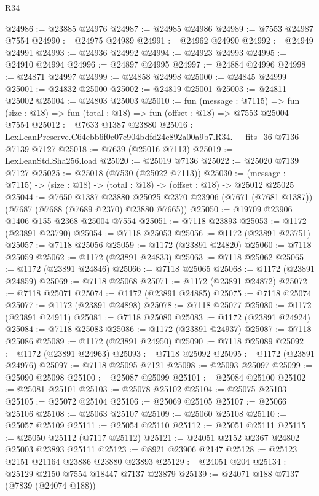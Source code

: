 \begin{lexlean}{R34}
\begin{coremodule}
@24986 := @23885 @24976
@24987 := @24985 @24986
@24989 := @7553 @24987 @7554
@24990 := @24975 @24989
@24991 := @24962 @24990
@24992 := @24949 @24991
@24993 := @24936 @24992
@24994 := @24923 @24993
@24995 := @24910 @24994
@24996 := @24897 @24995
@24997 := @24884 @24996
@24998 := @24871 @24997
@24999 := @24858 @24998
@25000 := @24845 @24999
@25001 := @24832 @25000
@25002 := @24819 @25001
@25003 := @24811 @25002
@25004 := @24803 @25003
@25010 := fun (message : @7115) =>
  fun (size : @18) => fun (total : @18) => fun (offset : @18) => @7553 @25004 @7554
@25012 := @7633 @1387 @23880
@25016 := LexLeanPreserve.C64ebb6f0c07e904bdfd24c892a00a9b7.R34.__fits_36 @7136 @7139 @7127
@25018 := @7639 (@25016 @7113)
@25019 := LexLeanStd.Sha256.load
@25020 := @25019 @7136
@25022 := @25020 @7139 @7127
@25025 := @25018 (@7530 (@25022 @7113))
@25030 := (message : @7115) -> (size : @18) -> (total : @18) -> (offset : @18) -> @25012 @25025
@25044 := @7650
    @1387
    @23880
    @25025
    @2370
    @23906
    (@7671 (@7681 @1387))
    (@7687 (@7688 (@7689 @2370) @23880 @7665))
@25050 := @19709 @23906 @1406 @155 @2368 @25004 @7554
@25051 := @7118 @23893
@25053 := @1172 (@23891 @23790)
@25054 := @7118 @25053
@25056 := @1172 (@23891 @23751)
@25057 := @7118 @25056
@25059 := @1172 (@23891 @24820)
@25060 := @7118 @25059
@25062 := @1172 (@23891 @24833)
@25063 := @7118 @25062
@25065 := @1172 (@23891 @24846)
@25066 := @7118 @25065
@25068 := @1172 (@23891 @24859)
@25069 := @7118 @25068
@25071 := @1172 (@23891 @24872)
@25072 := @7118 @25071
@25074 := @1172 (@23891 @24885)
@25075 := @7118 @25074
@25077 := @1172 (@23891 @24898)
@25078 := @7118 @25077
@25080 := @1172 (@23891 @24911)
@25081 := @7118 @25080
@25083 := @1172 (@23891 @24924)
@25084 := @7118 @25083
@25086 := @1172 (@23891 @24937)
@25087 := @7118 @25086
@25089 := @1172 (@23891 @24950)
@25090 := @7118 @25089
@25092 := @1172 (@23891 @24963)
@25093 := @7118 @25092
@25095 := @1172 (@23891 @24976)
@25097 := @7118 @25095 @7121
@25098 := @25093 @25097
@25099 := @25090 @25098
@25100 := @25087 @25099
@25101 := @25084 @25100
@25102 := @25081 @25101
@25103 := @25078 @25102
@25104 := @25075 @25103
@25105 := @25072 @25104
@25106 := @25069 @25105
@25107 := @25066 @25106
@25108 := @25063 @25107
@25109 := @25060 @25108
@25110 := @25057 @25109
@25111 := @25054 @25110
@25112 := @25051 @25111
@25115 := @25050 @25112 (@7117 @25112)
@25121 := @24051 @2152 @2367 @24802 @25003 @23893 @25111
@25123 := @8921 @23906 @2147
@25128 := @25123 @2151 @21164 @23886 @23880 @23893
@25129 := @24051 @204
@25134 := @25129 @2150 @7554 @18447 @7137 @23879
@25139 := @24071 @188 @7137 (@7839 (@24074 @188))

\end{coremodule}
\end{lexlean}
